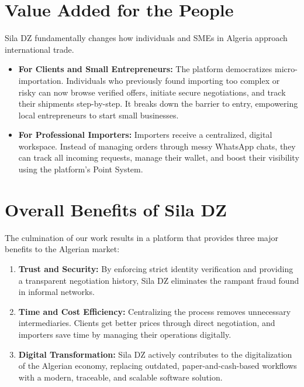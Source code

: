 \section{Value Added for the People}
Sila DZ fundamentally changes how individuals and SMEs in Algeria approach international trade.
\begin{itemize}
    \item \textbf{For Clients and Small Entrepreneurs:} The platform democratizes micro-importation. Individuals who previously found importing too complex or risky can now browse verified offers, initiate secure negotiations, and track their shipments step-by-step. It breaks down the barrier to entry, empowering local entrepreneurs to start small businesses.
    \item \textbf{For Professional Importers:} Importers receive a centralized, digital workspace. Instead of managing orders through messy WhatsApp chats, they can track all incoming requests, manage their wallet, and boost their visibility using the platform's Point System.
\end{itemize}

\section{Overall Benefits of Sila DZ}
The culmination of our work results in a platform that provides three major benefits to the Algerian market:
\begin{enumerate}
    \item \textbf{Trust and Security:} By enforcing strict identity verification and providing a transparent negotiation history, Sila DZ eliminates the rampant fraud found in informal networks.
    \item \textbf{Time and Cost Efficiency:} Centralizing the process removes unnecessary intermediaries. Clients get better prices through direct negotiation, and importers save time by managing their operations digitally.
    \item \textbf{Digital Transformation:} Sila DZ actively contributes to the digitalization of the Algerian economy, replacing outdated, paper-and-cash-based workflows with a modern, traceable, and scalable software solution.
\end{enumerate}
